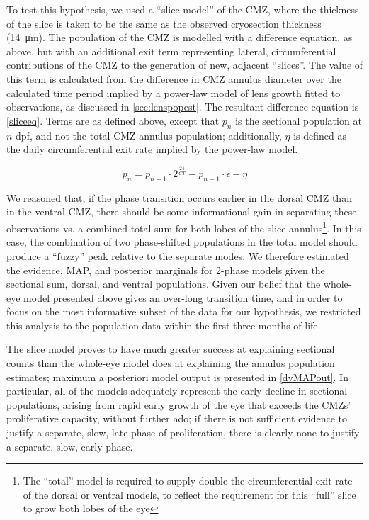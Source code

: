 To test this hypothesis, we used a ``slice model'' of the CMZ, where the thickness of the slice is taken to be the same as the observed cryosection thickness (\SI{14}{\micro\metre}). The population of the CMZ is modelled with a difference equation, as above, but with an additional exit term representing lateral, circumferential contributions of the CMZ to the generation of new, adjacent ``slices''. The value of this term is calculated from the difference in CMZ annulus diameter over the calculated time period implied by a power-law model of lens growth fitted to observations, as discussed in \autoref{sec:lenspopest}. The resultant difference equation is \autoref{sliceeq}. Terms are as defined above, except that $p_n$ is the sectional population at $n$ dpf, and not the total CMZ annulus population; additionally, $\eta$ is defined as the daily circumferential exit rate implied by the power-law model.

\begin{equation}
    p_n=p_{n-1} \cdot 2^{\frac{24}{CT}} - p_{n-1} \cdot \epsilon - \eta
    \label{sliceeq}
\end{equation}

We reasoned that, if the phase transition occurs earlier in the dorsal CMZ than in the ventral CMZ, there should be some informational gain in separating these observations vs. a combined total sum for both lobes of the slice annulus\footnote{The ``total'' model is required to supply double the circumferential exit rate of the dorsal or ventral models, to reflect the requirement for this ``full'' slice to grow both lobes of the eye}. In this case, the combination of two phase-shifted populations in the total model should produce a ``fuzzy'' peak relative to the separate modes. We therefore estimated the evidence, MAP, and posterior marginals for 2-phase models given the sectional sum, dorsal, and ventral populations. Given our belief that the whole-eye model presented above gives an over-long transition time, and in order to focus on the most informative subset of the data for our hypothesis, we restricted this analysis to the population data within the first three months of life.

The slice model proves to have much greater success at explaining sectional counts than the whole-eye model does at explaining the annulus population estimates; maximum a posteriori model output is presented in \autoref{dvMAPout}. In particular, all of the models adequately represent the early decline in sectional populations, arising from rapid early growth of the eye that exceeds the CMZs' proliferative capacity, without further ado; if there is not sufficient evidence to justify a separate, slow, late phase of proliferation, there is clearly none to justify a separate, slow, early phase. 


